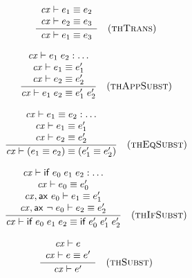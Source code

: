 \[
\frac{\begin{array}{c}\mathit{cx}\vdash e_1\equiv e_2\\\mathit{cx}\vdash e_2\equiv e_3\end{array}}{\mathit{cx}\vdash e_1\equiv e_3}\quad\mbox{(\textsc{thTrans})}
\]


\[
\frac{\begin{array}{c}\mathit{cx}\vdash e_1\;e_2:\ldots\\\mathit{cx}\vdash e_1\equiv e_1'\\\mathit{cx}\vdash e_2\equiv e_2'\end{array}}{\mathit{cx}\vdash e_1\;e_2\equiv e_1'\;e_2'}\quad\mbox{(\textsc{thAppSubst})}
\]


\[
\frac{\begin{array}{c}\mathit{cx}\vdash e_1\equiv e_2:\ldots\\\mathit{cx}\vdash e_1\equiv e_1'\\\mathit{cx}\vdash e_2\equiv e_2'\end{array}}{\mathit{cx}\vdash(e_1\equiv e_2)\equiv(e_1'\equiv e_2')}\quad\mbox{(\textsc{thEqSubst})}
\]

\[
\frac{\begin{array}{c}\mathit{cx}\vdash\mathsf{if}\;e_0\;e_1\;e_2:\ldots\\\mathit{cx}\vdash e_0\equiv e_0'\\\mathit{cx},\mathsf{ax}\ e_0\vdash e_1\equiv e_1'\\\mathit{cx},\mathsf{ax}\ \neg\;e_0\vdash e_2\equiv e_2'\end{array}}{\mathit{cx}\vdash\mathsf{if}\;e_0\;e_1\;e_2\equiv\mathsf{if}\;e_0'\;e_1'\;e_2'}\quad\mbox{(\textsc{thIfSubst})}
\]






\[
\frac{\begin{array}{c}\mathit{cx}\vdash e\\\mathit{cx}\vdash e\equiv e'\end{array}}{\mathit{cx}\vdash e'}\quad\mbox{(\textsc{thSubst})}
\]


